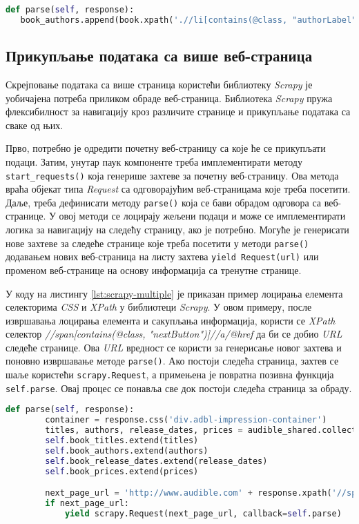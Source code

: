 \documentclass[12pt,oneside]{memoir}
\begin{document}
\begin{lstlisting}[language=Python, caption={Лоцирање елемента селекторима \textit{XPath} и \textit{CSS}}, label={lst:scrapy-css-xpath}]
def parse(self, response):
   book_authors.append(book.xpath('.//li[contains(@class, "authorLabel")]').css('a::text').get().strip())
\end{lstlisting}

\subsection{Прикупљање података са више веб-страница}
Скрејповање података са више страница користећи библиотеку \textit{Scrapy} је уобичајена потреба приликом обраде веб-страница. Библиотека \textit{Scrapy} пружа флексибилност за навигацију кроз различите странице и прикупљање података са сваке од њих. 

Прво, потребно је одредити почетну веб-страницу са које ће се прикупљати подаци. Затим, унутар паук компоненте треба имплементирати методу \texttt{start\_requests()} која генерише захтеве за почетну веб-страницу. Ова метода враћа објекат типа \textit{Request} са одговорајућим веб-страницама које треба посетити. Даље, треба дефинисати методу \texttt{parse()} која се бави обрадом одговора са веб-странице. У овој методи се лоцирају жељени подаци и може се имплементирати логика за навигацију на следећу страницу, ако је потребно. Могуће је генерисати нове захтеве за следеће странице које треба посетити у методи \texttt{parse()} додавањем нових веб-страница на листу захтева \texttt{yield Request(url)} или променом веб-странице на основу информација са тренутне странице.

У коду на листингу \ref{lst:scrapy-multiple} је приказан пример лоцирања елемента селекторима \textit{CSS} и \textit{XPath} у библиотеци \textit{Scrapy}. У овом примеру, после извршавања лоцирања елемента и сакупљања информација, користи се  \textit{XPath} селектор \textit{//span[contains(@class, "nextButton")]//a/@href}  да би се добио \textit{URL} следеће странице. Ова \textit{URL} вредност се користи за генерисање новог захтева и поновно извршавање методе \texttt{parse()}. Ако постоји следећа страница, захтев се шаље користећи \texttt{scrapy.Request}, а примењена је повратна позивна функција \texttt{self.parse}. Овај процес се понавља све док постоји следећа страница за обраду.

\begin{lstlisting}[language=Python, caption={Прикупљање података са више страница}, label={lst:scrapy-multiple}]
    def parse(self, response):
        container = response.css('div.adbl-impression-container')
        titles, authors, release_dates, prices = audible_shared.collect_books_info(container)
        self.book_titles.extend(titles)
        self.book_authors.extend(authors)
        self.book_release_dates.extend(release_dates)
        self.book_prices.extend(prices)

        next_page_url = 'http://www.audible.com' + response.xpath('//span[contains(@class, "nextButton")]//a/@href').get()
        if next_page_url:
            yield scrapy.Request(next_page_url, callback=self.parse)     
\end{lstlisting}
\end{document}
